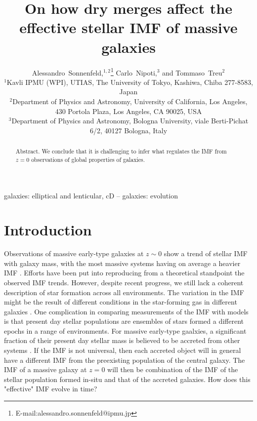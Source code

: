 \documentclass[usenatbib, letters]{mnras}
\begin{document}
\title{On how dry merges affect the effective stellar IMF of massive galaxies}
\author[Sonnenfeld et al.]{
Alessandro~Sonnenfeld,$^{1,2}$\thanks{E-mail:alessandro.sonnenfeld@ipmu.jp}
Carlo~Nipoti,$^{3}$
and Tommaso~Treu$^{2}$
\\
$^{1}$Kavli IPMU (WPI), UTIAS, The University of Tokyo, Kashiwa, Chiba 277-8583, Japan \\
$^{2}$Department of Physics and Astronomy, University of California, Los Angeles, 430 Portola Plaza, Los Angeles, CA 90025, USA \\
$^{3}$Department of Physics and Astronomy, Bologna University, viale Berti-Pichat 6/2, 40127 Bologna, Italy
}

\maketitle

\begin{abstract}
Abstract.
We conclude that it is challenging to infer what regulates the IMF from $z=0$ observations of global properties of galaxies.
\end{abstract}

\begin{keywords}
   galaxies: elliptical and lenticular, cD -- galaxies: evolution
\end{keywords}

\section{Introduction}\label{sect:intro}

Observations of massive early-type galaxies at $z\sim0$ show a trend of stellar IMF with galaxy mass, with the most massive systems having on average a heavier IMF \citep{Tre++10,Cap++12}.
Efforts have been put into reproducing from a theoretical standpoint the observed IMF trends. However, despite recent progress, we still lack a coherent description of star formation across all environments.
The variation in the IMF might be the result of different conditions in the star-forming gas in different galaxies \citep{Hop13}.
One complication in comparing measurements of the IMF with models is that present day stellar populations are ensembles of stars formed a different epochs in a range of environments.
For massive early-type gaalxies, a significant fraction of their present day stellar mass is believed to be accreted from other systems \citep{vDo++10}.
If the IMF is not universal, then each accreted object will in general have a different IMF from the preexisting population of the central galaxy.
The IMF of a massive galaxy at $z=0$ will then be combination of the IMF of the stellar population formed in-situ and that of the accreted galaxies.
How does this "effective" IMF evolve in time?
\end{document}
